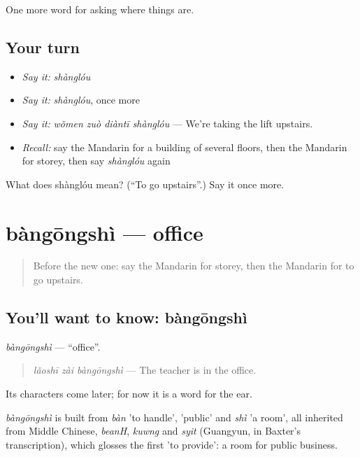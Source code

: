 \begin{grammarlens}[title={What you've built}]
One more word for asking where things are.
\end{grammarlens}

\subsection*{Your turn}
\begin{itemize}
\raggedright
  \item \emph{Say it:} \emph{shànglóu}
  \item \emph{Say it:} \emph{shànglóu}, once more
  \item \emph{Say it:} \emph{wǒmen zuò diàntī shànglóu} — We're taking the lift upstairs.
  \item \emph{Recall:} say the Mandarin for a building of several floors, then the Mandarin for storey, then say \emph{shànglóu} again
\end{itemize}

\begin{tcolorbox}[breakable,colback=teal!4,colframe=teal!35!black,title={Before you move on}]
What does shànglóu mean? (\textquotedblleft{}To go upstairs\textquotedblright{}.) Say it once more.
\end{tcolorbox}
\section[bàngōngshì]{bàngōngshì — office}

\label{lesson:ZH-C206-bangongshi}



\begin{quote}
Before the new one: say the Mandarin for storey, then the Mandarin for to go upstairs.
\end{quote}

\subsection*{You'll want to know: bàngōngshì}
\emph{bàngōngshì} — \textquotedblleft{}office\textquotedblright{}.

\begin{quote}
\emph{lǎoshī zài bàngōngshì} — The teacher is in the office.
\end{quote}

Its characters come later; for now it is a word for the ear.

\begin{cousinweb}
\emph{bàngōngshì} is built from \emph{bàn} 'to handle',  'public' and \emph{shì} 'a room', all inherited from Middle Chinese, \emph{beanH}, \emph{kuwng} and \emph{syit} (Guangyun, in Baxter's transcription), which glosses the first 'to provide': a room for public business.
\end{cousinweb}

